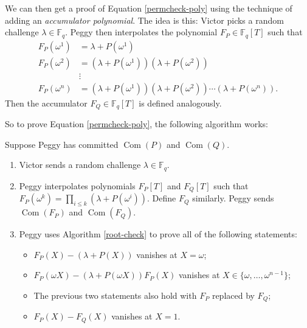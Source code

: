 We can then get a proof of
Equation \ref{permcheck-poly} using the technique of
adding an \emph{accumulator polynomial}. The idea is this: Victor picks
a random challenge \(\lambda \in {\mathbb{F}}_{q}\). Peggy then
interpolates the polynomial
\(F_{P} \in {\mathbb{F}}_{q}[ T]\) such that
\[\begin{aligned}
F_{P}( \omega^{1} ) & = \lambda + P( \omega^{1} ) \\
F_{P}( \omega^{2} ) & = ( \lambda + P( \omega^{1} ) )( \lambda + P( \omega^{2} ) ) \\
 & \vdots \\
F_{P}( \omega^{n} ) & = ( \lambda + P( \omega^{1} ) )( \lambda + P( \omega^{2} ) )\cdots( \lambda + P( \omega^{n} ) ).
\end{aligned}\] Then the accumulator
\(F_{Q} \in {\mathbb{F}}_{q}[ T]\) is defined analogously.

So to prove Equation \ref{permcheck-poly}, the
following algorithm works:

\begin{algo}
Suppose Peggy has committed \(\operatorname{Com}(P)\)
and \(\operatorname{Com}(Q)\).

\begin{enumerate}
\item
  Victor sends a random challenge \(\lambda \in {\mathbb{F}}_{q}\).
\item
  Peggy interpolates polynomials \(F_{P}[ T]\) and
  \(F_{Q}[ T]\) such that
  \(F_{P}( \omega^{k} ) = \prod_{i \leq k}( \lambda + P( \omega^{i} ) )\).
  Define \(F_{Q}\) similarly. Peggy sends \(\operatorname{Com}(F_{P})\)
  and \(\operatorname{Com}(F_{Q})\).
\item
  Peggy uses Algorithm \ref{root-check} to prove all of the following statements:

  \begin{itemize}
  \item
    \(F_{P}(X) - ( \lambda + P(X) )\) vanishes at
    \(X = \omega\);
  \item
    \(F_{P}(\omega X) - ( \lambda + P(\omega X) )F_{P}(X)\)
    vanishes at \(X \in \{ \omega,\ldots,\omega^{n - 1} \}\);
  \item
    The previous two statements also hold with \(F_{P}\) replaced by
    \(F_{Q}\);
  \item
    \(F_{P}(X) - F_{Q}(X)\) vanishes at \(X = 1\).
  \end{itemize}
\end{enumerate}
\end{algo}

